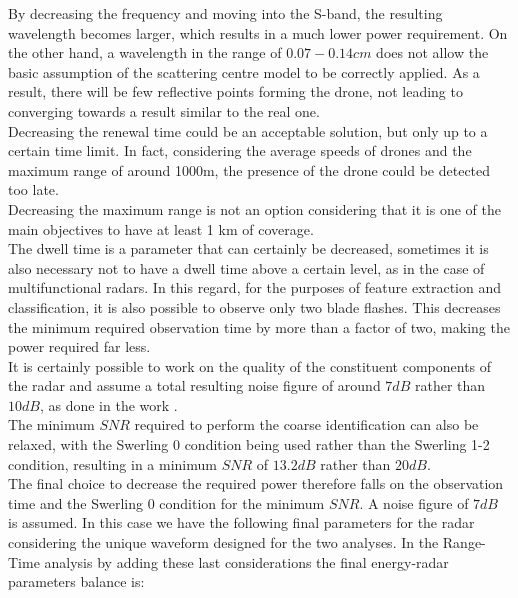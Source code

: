 By decreasing the frequency and moving into the S-band, the resulting wavelength becomes larger, which results in a much lower power requirement. On the other hand, a wavelength in the range of $0.07-0.14 cm$ does not allow the basic assumption of the scattering centre model to be correctly applied. As a result, there will be few reflective points forming the drone, not leading to converging towards a result similar to the real one.\\
Decreasing the renewal time could be an acceptable solution, but only up to a certain time limit. In fact, considering the average speeds of drones and the maximum range of around 1000m, the presence of the drone could be detected too late.\\
Decreasing the maximum range is not an option considering that it is one of the main objectives to have at least 1 km of coverage.\\
The dwell time is a parameter that can certainly be decreased, sometimes it is also necessary not to have a dwell time above a certain level, as in the case of multifunctional radars. In this regard, for the purposes of feature extraction and classification, it is also possible to observe only two blade flashes. This decreases the minimum required observation time by more than a factor of two, making the power required far less.\\
It is certainly possible to work on the quality of the constituent components of the radar and assume a total resulting noise figure of around $7 dB$ rather than $10 dB$, as done in the work \cite{MartinMulgrew}.\\
The minimum $SNR$ required to perform the coarse identification can also be relaxed, with the Swerling 0 condition being used rather than the Swerling 1-2 condition, resulting in a minimum $SNR$ of $13.2 dB$ rather than $20 dB$.\\
The final choice to decrease the required power therefore falls on the observation time and the Swerling 0 condition for the minimum $SNR$. A noise figure of $7 dB$ is assumed. In this case we have the following final parameters for the radar considering the unique waveform designed for the two analyses. In the Range-Time analysis by adding these last considerations the final energy-radar parameters balance is:


